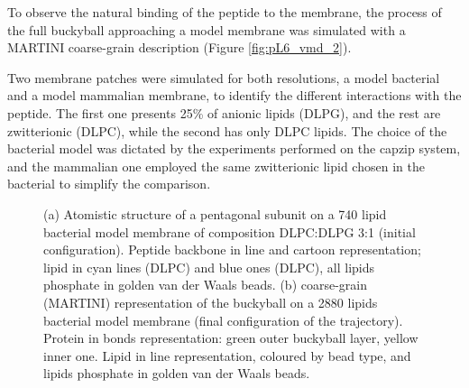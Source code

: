To observe the natural binding of the peptide to the membrane, the process of the full buckyball approaching a model membrane was simulated with a MARTINI coarse-grain description (Figure \ref{fig:pL6_vmd_2}).

Two membrane patches were simulated for both resolutions, a model bacterial and a model mammalian membrane, to identify the different interactions with the peptide. The first one presents 25\% of anionic lipids (DLPG), and the rest are zwitterionic (DLPC), while the second has only DLPC lipids. The choice of the bacterial model was dictated by the experiments performed on the capzip system, and the mammalian one employed the same zwitterionic lipid chosen in the bacterial to simplify the comparison.

\begin{figure}[t]
\centering
{}
\caption[Snapshot of simulations of capzip on model membranes]{(a) Atomistic structure of a pentagonal subunit on a 740 lipid bacterial model membrane of composition DLPC:DLPG 3:1 (initial configuration). Peptide backbone in line and cartoon representation; lipid in cyan lines (DLPC) and blue ones (DLPC), all lipids phosphate in golden van der Waals beads. (b) coarse-grain (MARTINI) representation of the buckyball on a 2880 lipids bacterial model membrane (final configuration of the trajectory). Protein in bonds representation: green outer buckyball layer, yellow inner one. Lipid in line representation, coloured by bead type, and lipids phosphate in golden van der Waals beads.}
\label{fig:pL6_vmd}
\end{figure}


